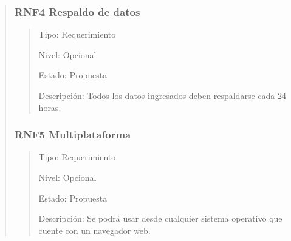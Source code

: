 \documentclass[14pt]{article}
\begin{document}
\begin{quote}
                \subsubsection{RNF4 Respaldo de datos}\label{RNF4 Respaldo de datos}
                    \begin{quote}
                        Tipo: Requerimiento
    
                        Nivel: Opcional
    
                        Estado: Propuesta
    
                        Descripción: Todos los datos ingresados deben respaldarse cada 24 horas.
                    \end{quote}
                \subsubsection{RNF5 Multiplataforma}\label{RNF5 Multiplataforma}
                    \begin{quote}
                        Tipo: Requerimiento
    
                        Nivel: Opcional
    
                        Estado: Propuesta
    
                        Descripción: Se podrá usar desde cualquier sistema operativo que cuente con un navegador web.
                    \end{quote}
            \end{quote}
\end{document}
